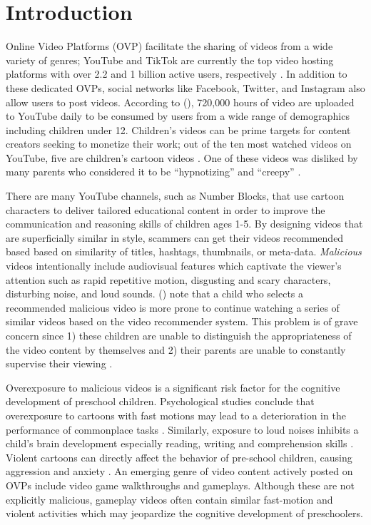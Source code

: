 \documentclass[letterpaper]{article}
\begin{document}
\section{Introduction}
Online Video Platforms (OVP) facilitate the sharing of videos from a wide variety of genres; YouTube and TikTok are currently the top video hosting platforms with over 2.2 and 1 billion active users, respectively \cite{doyle_2022_tiktok}. In addition to these dedicated OVPs, social networks like Facebook, Twitter, and Instagram also allow users to post videos. According to \citeauthor{ruby_2022_youtube} (\citeyear{ruby_2022_youtube}), 720,000 hours of video are uploaded to YouTube daily to be consumed by users from a wide range of demographics including children under 12.
Children's videos can be prime targets for content creators seeking to monetize their work; out
 of the ten most watched videos on YouTube, five are children's cartoon videos \cite{ceci_2022_youtube}. One of these videos was disliked by many parents who considered it to be ``hypnotizing'' and ``creepy'' \cite{sinelschikova_2020_this}. 
 
There are many YouTube channels, such as Number Blocks, that use cartoon characters to deliver tailored educational content in order to improve the communication and reasoning skills of children ages 1-5.  By designing videos that are superficially similar in style, scammers can get their videos recommended based based on similarity of titles, hashtags, thumbnails, or meta-data.  \textit{Malicious} videos intentionally include audiovisual features which captivate the viewer's attention such as rapid repetitive motion, disgusting and scary characters, disturbing noise, and loud sounds. \citeauthor{10} (\citeyear{10}) note that a child who selects a recommended malicious video is more prone to continue watching a series of similar videos based on the video recommender system. This problem is of grave concern since 1) these children are unable to distinguish the appropriateness of the video content by themselves and 2) their parents are unable to constantly supervise their viewing \cite{screen_time}.

Overexposure to malicious videos is a significant risk factor for the cognitive development of preschool children.  Psychological studies conclude that overexposure to cartoons with fast motions may lead to a deterioration in the performance of commonplace tasks \cite{Lillard_Peterson_2011}. Similarly, exposure to loud noises inhibits a child's brain development especially reading, writing and comprehension skills \cite{Klatte_Bergström_Lachmann_2013}. Violent cartoons can directly affect the behavior of pre-school children, causing aggression and anxiety \cite{violent_cartoons}. 
An emerging genre of video content actively posted on OVPs include video game walkthroughs and gameplays. Although these are not explicitly malicious, gameplay videos often contain similar fast-motion and violent activities which may jeopardize the cognitive development of preschoolers.
\end{document}
